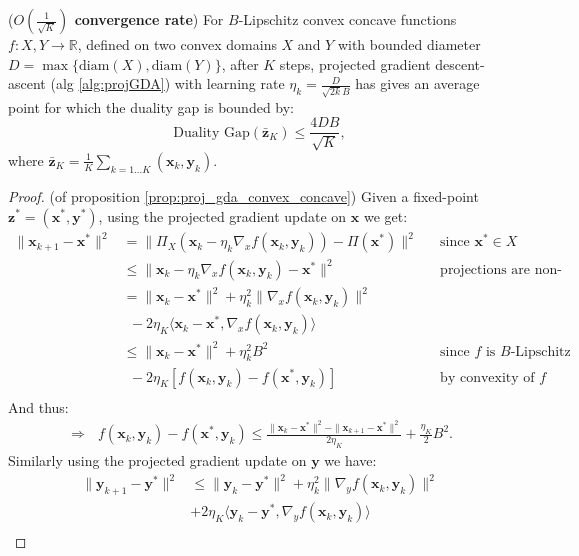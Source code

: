 \begin{proposition}
    \label{prop:proj_gda_convex_concave}
    (\textbf{$O(\frac{1}{\sqrt{K}})$ convergence rate}) For $B$-Lipschitz convex concave functions $f:X,Y \rightarrow \mathbb{R}$, defined on two convex domains $X$ and $Y$ with bounded diameter $D=\max \lbrace  \text{diam}(X), \text{diam}(Y) \rbrace$, after $K$ steps, projected gradient descent-ascent (alg \ref{alg:projGDA}) with learning rate $\eta_k = \frac{D}{\sqrt{2k}B}$ has gives an average point for which the duality gap is bounded by:
    \[
        \text{Duality Gap}(\bar{\bm{z}}_K) \leq \frac{4 D B}{\sqrt{K}},
    \]
    where $\bar{\bm{z}}_K = \frac{1}{K} \sum_{k = 1...K} (\bm{x}_k,\bm{y}_k)$.
\end{proposition}
\begin{proof}
    (of proposition \ref{prop:proj_gda_convex_concave}) Given a fixed-point $\bm{z}^*=(\bm{x}^*,\bm{y}^*)$, using the projected gradient update on $\bm{x}$ we get:
    \begin{align*}
        \| \bm{x}_{k+1}-\bm{x}^* \|^2 &= \| \Pi_X(\bm{x}_{k}-\eta_k \nabla_x f(\bm{x}_k,\bm{y}_k) ) - \Pi(\bm{x}^*) \|^2 && \text{since $\bm{x}^*\in X$} \\
        &\leq \| \bm{x}_{k}-\eta_k \nabla_x f(\bm{x}_k,\bm{y}_k) - \bm{x}^* \|^2 && \text{projections are non-expansive} \\
        & = \| \bm{x}_k - \bm{x}^* \|^2 + \eta_k^2 \| \nabla_x f(\bm{x}_k,\bm{y}_k)\|^2  \\ & ~ ~ - 2 \eta_K \langle  \bm{x}_k - \bm{x}^*,  \nabla_x f(\bm{x}_k,\bm{y}_k) \rangle \\
        & \leq \| \bm{x}_k - \bm{x}^* \|^2 + \eta_k^2 B^2 && \text{since $f$ is $B$-Lipschitz} \\ & ~ ~ - 2  \eta_K [f(\bm{x}_k,\bm{y}_k)-f(\bm{x}^*,\bm{y}_k)] && \text{by convexity of $f$}\\
    \end{align*}
    And thus:
    \begin{align*}
        \Rightarrow ~~~ f(\bm{x}_k,\bm{y}_k)-f(\bm{x}^*,\bm{y}_k) \leq \frac{  \| \bm{x}_k - \bm{x}^* \|^2 - \| \bm{x}_{k+1}-\bm{x}^* \|^2
        }{2 \eta_K
        } + \frac{\eta_K}{2} B^2. \tag{a}
    \end{align*}
    Similarly using the projected gradient update on $\bm{y}$ we have:
    \begin{align*}
        \| \bm{y}_{k+1}-\bm{y}^* \|^2 &\leq \| \bm{y}_k - \bm{y}^* \|^2 + \eta_k^2 \| \nabla_y f(\bm{x}_k,\bm{y}_k)\|^2 \\ &  + 2 \eta_K \langle  \bm{y}_k - \bm{y}^*,  \nabla_y f(\bm{x}_k,\bm{y}_k) \rangle \\

\end{align*}
\end{proof}
